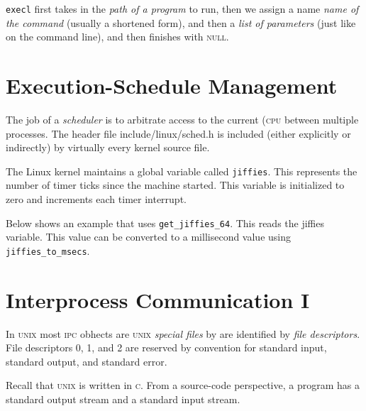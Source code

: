 \lstinline{execl} first takes in the \textit{path of a program} to run,
then we assign a name \textit{name of the command} (usually a shortened form), 
and then a  \textit{list of parameters} (just like on 
the command line), and then finishes with \textsc{null}.







\section{Execution-Schedule Management}

The job of a \textit{scheduler} is to arbitrate access to the 
current (\textsc{cpu} between multiple processes.
The header file include/linux/sched.h is included (either explicitly or indirectly) by
virtually every kernel source file.

The Linux kernel maintains a global variable called \lstinline{jiffies}. 
This represents the number of timer ticks since the machine started. 
This variable is initialized to zero and increments each timer interrupt.

Below shows an example that uses \lstinline{get_jiffies_64}. This reads the jiffies 
variable. This value can be converted to a millisecond value using 
\lstinline{jiffies_to_msecs}.







\section{Interprocess Communication I}





In \textsc{unix} most \textsc{ipc} obhects are \textsc{unix} \textit{special files} by 
are identified by \textit{file descriptors}. 
File descriptors 0, 1, and 2 are reserved by convention 
for standard input, standard output, and standard error.

Recall that \textsc{unix} is written in \textsc{c}. From a source-code perspective, 
a program has a standard output stream and a standard input stream. 

